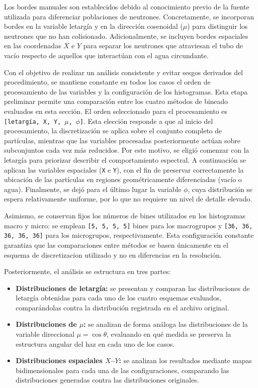 Los bordes manuales son establecidos debido al conocimiento previo de la fuente utilizada para diferenciar poblaciones de neutrones. Concretamente, se incorporan bordes en la variable letargía y en la dirección cosenoidal ($\mu$) para distinguir los neutrones que no han colisionado. Adicionalmente, se incluyen bordes espaciales en las coordenadas $X$ e $Y$ para separar los neutrones que atraviesan el tubo de vacío respecto de aquellos que interactúan con el agua circundante.

Con el objetivo de realizar un análisis consistente y evitar sesgos derivados del procedimiento, se mantiene constante en todos los casos el orden de procesamiento de las variables y la configuración de los histogramas. Esta etapa preliminar permite una comparación entre los cuatro métodos de bineado evaluados en esta sección. El orden seleccionado para el procesamiento es \texttt{[letargía, X, Y, $\mu$, $\phi$]}. Esta elección responde a que al inicio del procesamiento, la discretización se aplica sobre el conjunto completo de partículas, mientras que las variables procesadas posteriormente actúan sobre subconjuntos cada vez más reducidos. Por este motivo, se eligió comenzar con la letargía para priorizar describir el comportamiento espectral. A continuación se aplican las variables espaciales (\texttt{X} e \texttt{Y}), con el fin de preservar correctamente la ubicación de las partículas en regiones geométricamente diferenciadas (vacío o agua). Finalmente, se dejó para el último lugar la variable \texttt{$\phi$}, cuya distribución se espera relativamente uniforme, por lo que no requiere un nivel de detalle elevado.

Asimismo, se conservan fijos los números de bines utilizados en los histogramas macro y micro: se emplean \texttt{[5, 5, 5, 5]} bines para los macrogrupos y \texttt{[36, 36, 36, 36, 36]} para los microgrupos, respectivamente. Esta configuración constante garantiza que las comparaciones entre métodos se basen únicamente en el esquema de discretizacion utilizado y no en diferencias en la resolución.

Posteriormente, el análisis se estructura en tres partes:

\begin{itemize}
\item \textbf{Distribuciones de letargía:} se presentan y comparan las distribuciones de letargía obtenidas para cada uno de los cuatro esquemas evaluados, comparándolas contra la distribución registrada en el archivo original.
\item \textbf{Distribuciones de $\mu$:} se analizan de forma análoga las distribuciones de la variable direccional $\mu = \cos\theta$, evaluando en qué medida se preserva la estructura angular del haz en cada uno de los casos.

\item \textbf{Distribuciones espaciales $X$–$Y$:} se analizan los resultados mediante mapas bidimensionales para cada una de las configuraciones, comparando las distribuciones generadas contra las distribuciones originales.
\end{itemize}

